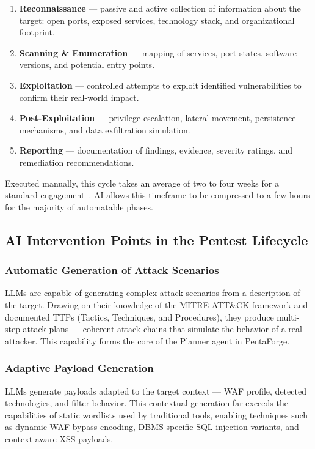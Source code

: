 \documentclass[12pt,a4paper]{report}
\begin{document}
\begin{enumerate}
    \item \textbf{Reconnaissance} --- passive and active collection of information
    about the target: open ports, exposed services, technology stack, and
    organizational footprint.
    \item \textbf{Scanning \& Enumeration} --- mapping of services, port states,
    software versions, and potential entry points.
    \item \textbf{Exploitation} --- controlled attempts to exploit identified
    vulnerabilities to confirm their real-world impact.
    \item \textbf{Post-Exploitation} --- privilege escalation, lateral movement,
    persistence mechanisms, and data exfiltration simulation.
    \item \textbf{Reporting} --- documentation of findings, evidence, severity
    ratings, and remediation recommendations.
\end{enumerate}

Executed manually, this cycle takes an average of two to four weeks for a standard
engagement~\cite{triaxiomTimeline,valuementorLifecycle}. AI allows this timeframe to
be compressed to a few hours for the majority of automatable phases.

\subsection{AI Intervention Points in the Pentest Lifecycle}

\subsubsection{Automatic Generation of Attack Scenarios}

LLMs are capable of generating complex attack scenarios from a description of the
target. Drawing on their knowledge of the MITRE ATT\&CK framework and documented
TTPs (Tactics, Techniques, and Procedures), they produce multi-step attack plans
--- coherent attack chains that simulate the behavior of a real attacker. This
capability forms the core of the Planner agent in PentaForge.

\subsubsection{Adaptive Payload Generation}

LLMs generate payloads adapted to the target context --- WAF profile, detected
technologies, and filter behavior. This contextual generation far exceeds the
capabilities of static wordlists used by traditional tools, enabling techniques
such as dynamic WAF bypass encoding, DBMS-specific SQL injection variants, and
context-aware XSS payloads.
\end{document}
